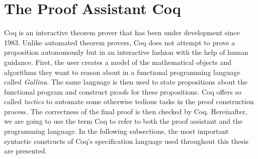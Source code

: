 \section{The Proof Assistant Coq} \label{sec:preliminaries:coq}
Coq is an interactive theorem prover that has been under development since 1983.
Unlike automated theorem provers, Coq does not attempt to prove a proposition autonomously but in an interactive fashion with the help of human guidance.
First, the user creates a model of the mathematical objects and algorithms they want to reason about in a functional programming language called \textit{Gallina}.
The same language is then used to state propositions about the functional program and construct proofs for these propositions.
Coq offers so called \textit{tactics} to automate some otherwise tedious tasks in the proof construction process.
The correctness of the final proof is then checked by Coq.
Hereinafter, we are going to use the term Coq to refer to both the proof assistant and the programming language.
In the following subsections, the most important syntactic constructs of Coq's specification language used throughout this thesis are presented.

